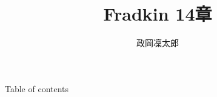 \documentclass[8pt,unicode,xcolor=svgnames]{beamer}
\numberwithin{equation}{section}
\begin{document}
\title{Fradkin 14章}
\author{政岡凜太郎}
\frame{\titlepage}
\begin{frame}{Table of contents}\tableofcontents\end{frame}


\end{document}
